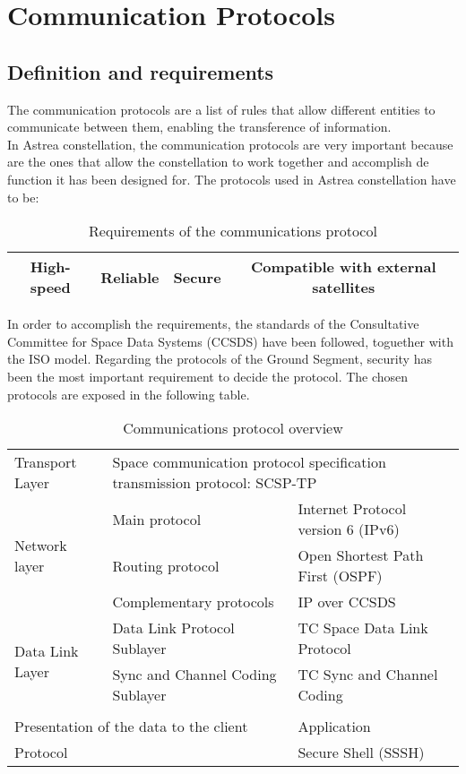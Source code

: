 \section{Communication Protocols}
\subsection{Definition and requirements}
The communication protocols are a list of rules that allow different entities to communicate between them, enabling the transference of information.\\
In Astrea constellation, the communication protocols are very important because are the ones that allow the constellation to work together and accomplish de function it has been designed for. The protocols used in Astrea constellation have to be: 
\begin{table}[H]
\begin{center}
\begin{tabular}{|c|c|c|c|}
\hline
\rowcolor{blue} High-speed & Reliable &Secure&Compatible with external satellites\\
\hline
\end{tabular}
\caption{Requirements of the communications protocol}
\end{center}
\end{table}
In order to accomplish the requirements, the standards of the Consultative Committee for Space Data Systems (CCSDS) have been followed, toguether with the ISO model. Regarding the protocols of the Ground Segment, security has been the most important requirement to decide the protocol. The chosen protocols are exposed in the following table.
\begin{table}[H]
\begin{center}
\begin{tabular}{|l|l|l|}
\hline
\rowcolor{blue} \multicolumn{3}{|c|}{\textbf{Space segment: CCSDS Standards}}\\
\hline
Transport Layer&\multicolumn{2}{|l|}{Space communication protocol specification transmission protocol: SCSP-TP}\\
\hline
\multirow{3}{*}{Network layer}&Main protocol&Internet Protocol version 6 (IPv6)\\
&Routing protocol&Open Shortest Path First (OSPF)\\
&Complementary protocols&IP over CCSDS\\
\hline
\multirow{2}{*}{Data Link Layer}&Data Link Protocol Sublayer&TC Space Data Link Protocol\\
&Sync and Channel Coding Sublayer&TC Sync and Channel Coding\\
\hline
\rowcolor{blue} \multicolumn{3}{|c|}{\textbf{Ground segment}}\\
\hline
\multicolumn{2}{|l|}{Presentation of the data to the client}&Application\\
\hline
\multicolumn{2}{|l|}{Protocol}&Secure Shell (SSSH)\\
\hline
\end{tabular}
\caption{Communications protocol overview}
\end{center}
\end{table}
